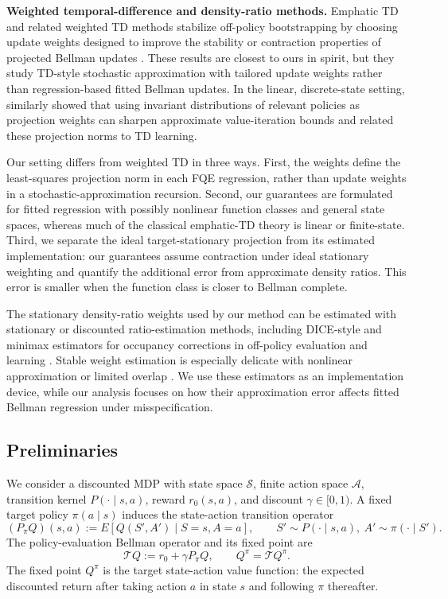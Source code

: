 \documentclass{article}
\theoremstyle{plain}
\theoremstyle{definition}
\theoremstyle{remark}
\begin{document}
\textbf{Weighted temporal-difference and density-ratio methods.}
Emphatic TD and related weighted TD methods stabilize off-policy bootstrapping
by choosing update weights designed to improve the stability or contraction
properties of projected Bellman updates
\citep{precup2001off,yu2012weighted,mahmood2015emphatic,
sutton2016emphatic,hallak2016generalized,yu2018generalized,
patterson2022generalized}. These results are closest to ours in spirit, but
they study TD-style stochastic approximation with tailored update weights rather
than regression-based fitted Bellman updates. In the linear, discrete-state
setting, \citet{van2006performance} similarly showed that using invariant
distributions of relevant policies as projection weights can sharpen approximate
value-iteration bounds and related these projection norms to TD learning.

Our setting differs from weighted TD in three ways. First, the weights define
the least-squares projection norm in each FQE regression, rather than update
weights in a stochastic-approximation recursion. Second, our guarantees are
formulated for fitted regression with possibly nonlinear function classes and
general state spaces, whereas much of the classical emphatic-TD theory is
linear or finite-state. Third, we separate the ideal target-stationary
projection from its estimated implementation: our guarantees assume contraction
under ideal stationary weighting and quantify the additional error from
approximate density ratios. This error is smaller when the function class is
closer to Bellman complete.

The stationary density-ratio weights used by our method can be estimated with
stationary or discounted ratio-estimation methods, including DICE-style and
minimax estimators for occupancy corrections in off-policy evaluation and
learning
\citep{liu2018breaking,hallak2017consistent,nachum2019dualdice,
zhang2020gendice,uehara2020minimax,uehara2021finite}. Stable weight estimation
is especially delicate with nonlinear approximation or limited overlap
\citep{zhang2022truncated,mehrabi2024off,patterson2022generalized,
uehara2021finite}. We use these estimators as an implementation device, while
our analysis focuses on how their approximation error affects fitted Bellman
regression under misspecification.
\subsection{Preliminaries}

We consider a discounted MDP with state space \(\mathcal S\), finite action
space \(\mathcal A\), transition kernel \(P(\cdot\mid s,a)\), reward
\(r_0(s,a)\), and discount \(\gamma\in[0,1)\). A fixed target policy
\(\pi(a\mid s)\) induces the state-action transition operator
\[
(P_\pi Q)(s,a)
:=
E\!\left[Q(S',A')\mid S=s,A=a\right],
\qquad
S'\sim P(\cdot\mid s,a),\ A'\sim\pi(\cdot\mid S').
\]
The policy-evaluation Bellman operator and its fixed point are
\[
    \mathcal T Q := r_0+\gamma P_\pi Q,
    \qquad
    Q^\pi = \mathcal T Q^\pi .
\]
The fixed point \(Q^\pi\) is the target state-action value function: the
expected discounted return after taking action \(a\) in state \(s\) and following
\(\pi\) thereafter.
\end{document}
